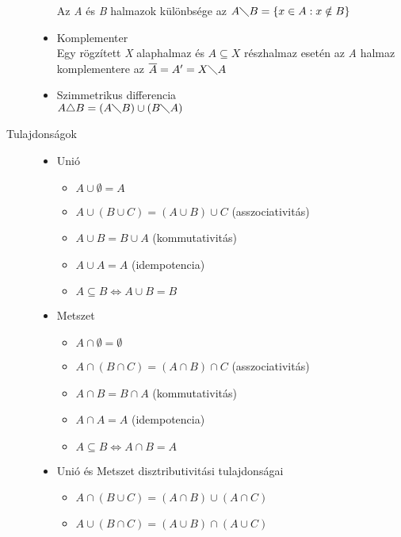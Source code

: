 \documentclass[margin=0px]{article}
\begin{document}
\begin{description}
\begin{itemize}
                  Az {\it A} és {\it B} halmazok különbsége az $A \diagdown B = \{ x \in A : x \notin B \}$
            \item Komplementer \\
                  Egy rögzített {\it X} alaphalmaz és $A \subseteq X$ részhalmaz esetén az {\it A} halmaz komplementere az $ \overline{A} = A' = X \diagdown A$
            \item Szimmetrikus differencia \\
                  $A \triangle B = (A \diagdown B) \cup (B \diagdown A)$
        \end{itemize}
    \item[Tulajdonságok] \hfill
        \begin{itemize}
            \item Unió
                  \begin{itemize}
                      \item $A \cup \emptyset = A$
                      \item $A \cup ( B \cup C ) = (A \cup B) \cup C$ (asszociativitás)
                      \item $A \cup B = B \cup A$ (kommutativitás)
                      \item $A \cup A = A$ (idempotencia)
                      \item $A \subseteq B \Longleftrightarrow A \cup B = B$
                  \end{itemize}
            \item Metszet
                  \begin{itemize}
                      \item $A \cap \emptyset = \emptyset$
                      \item $A \cap ( B \cap C ) = (A \cap B) \cap C$ (asszociativitás)
                      \item $A \cap B = B \cap A$ (kommutativitás)
                      \item $A \cap A = A$ (idempotencia)
                      \item $A \subseteq B \Longleftrightarrow A \cap B = A$
                  \end{itemize}
            \item Unió és Metszet disztributivitási tulajdonságai
                  \begin{itemize}
                      \item $A \cap ( B \cup C ) = (A \cap B) \cup (A \cap C)$
                      \item $A \cup ( B \cap C ) = (A \cup B) \cap (A \cup C)$

\end{itemize}
\end{itemize}
\end{description}
\end{document}
